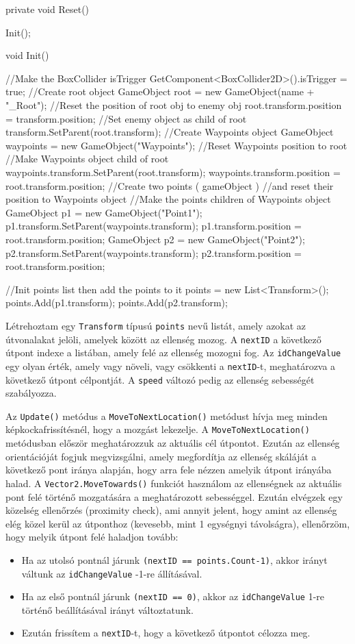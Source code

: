 \begin{java}
private void Reset()
{
    Init();
    
}
void Init()
{
    //Make the BoxCollider isTrigger
    GetComponent<BoxCollider2D>().isTrigger = true;
    //Create root object
    GameObject root = new GameObject(name + "_Root");
    //Reset the position of root obj to enemy obj
    root.transform.position = transform.position;
    //Set enemy object as child of root
    transform.SetParent(root.transform);
    //Create Waypoints object
    GameObject waypoints = new GameObject("Waypoints");
    //Reset Waypoints position to root
    //Make Waypoints object child of root
    waypoints.transform.SetParent(root.transform);
    waypoints.transform.position =
        root.transform.position;
    //Create two points ( gameObject )
    //and reset their position to Waypoints object
    //Make the points children of Waypoints object
    GameObject p1 = new GameObject("Point1"); 
    p1.transform.SetParent(waypoints.transform);
    p1.transform.position = root.transform.position;
    GameObject p2 = new GameObject("Point2"); 
    p2.transform.SetParent(waypoints.transform);
    p2.transform.position = root.transform.position;

    //Init points list then add the points to it
    points = new List<Transform>();
    points.Add(p1.transform);
    points.Add(p2.transform);
}
\end{java}

Létrehoztam egy \texttt{Transform} típusú \texttt{points} nevű listát, amely azokat az útvonalakat jelöli, amelyek között az ellenség mozog. A \texttt{nextID} a következő útpont indexe a listában, amely felé az ellenség mozogni fog. Az \texttt{idChangeValue} egy olyan érték, amely vagy növeli, vagy csökkenti a \texttt{nextID}-t, meghatározva a következő útpont célpontját. A \texttt{speed} változó pedig az ellenség sebességét szabályozza.

Az \texttt{Update()} metódus a \texttt{MoveToNextLocation()} metódust hívja meg minden képkockafrissítésnél, hogy a mozgást lekezelje. A \texttt{MoveToNextLocation()} metódusban először meghatározzuk az aktuális cél útpontot. Ezután az ellenség orientációját fogjuk megvizsgálni, amely megfordítja az ellenség skáláját a következő pont iránya alapján, hogy arra fele nézzen amelyik útpont irányába halad. A \texttt{Vector2.MoveTowards()} funkciót használom az ellenségnek az aktuális pont felé történő mozgatására a meghatározott sebességgel. Ezután elvégzek egy közelség ellenőrzés (proximity check), ami annyit jelent, hogy amint az ellenség elég közel kerül az útponthoz (kevesebb, mint 1 egységnyi távolságra), ellenőrzöm, hogy melyik útpont felé haladjon tovább:
\begin{itemize}
\item Ha az utolsó pontnál járunk \texttt{(nextID == points.Count-1)}, akkor irányt váltunk az \texttt{idChangeValue} -1-re állításával.
\item Ha az első pontnál járunk \texttt{(nextID == 0)}, akkor az \texttt{idChangeValue} 1-re történő beállításával irányt változtatunk.
\item Ezután frissítem a \texttt{nextID}-t, hogy a következő útpontot célozza meg.
\end{itemize}

